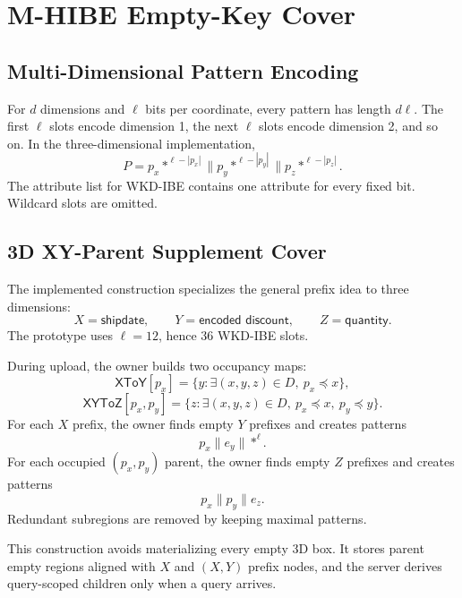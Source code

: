 \documentclass[11pt]{article}
\begin{document}
\section{M-HIBE Empty-Key Cover}

\subsection{Multi-Dimensional Pattern Encoding}

For $d$ dimensions and $\ell$ bits per coordinate, every pattern has length $d\ell$. The first $\ell$ slots encode dimension 1, the next $\ell$ slots encode dimension 2, and so on. In the three-dimensional implementation,
\[
  P = p_x *^{\ell-|p_x|}
  \parallel
  p_y *^{\ell-|p_y|}
  \parallel
  p_z *^{\ell-|p_z|}.
\]
The attribute list for WKD-IBE contains one attribute for every fixed bit. Wildcard slots are omitted.

\subsection{3D XY-Parent Supplement Cover}

The implemented construction specializes the general prefix idea to three dimensions:
\[
  X=\textsf{shipdate},\qquad
  Y=\textsf{encoded discount},\qquad
  Z=\textsf{quantity}.
\]
The prototype uses $\ell=12$, hence 36 WKD-IBE slots.

During upload, the owner builds two occupancy maps:
\[
  \mathsf{XToY}[p_x]
  =
  \{y : \exists (x,y,z)\in D,\ p_x\preceq x\},
\]
\[
  \mathsf{XYToZ}[p_x,p_y]
  =
  \{z : \exists (x,y,z)\in D,\ p_x\preceq x,\ p_y\preceq y\}.
\]
For each $X$ prefix, the owner finds empty $Y$ prefixes and creates patterns
\[
  p_x \parallel e_y \parallel *^\ell.
\]
For each occupied $(p_x,p_y)$ parent, the owner finds empty $Z$ prefixes and creates patterns
\[
  p_x \parallel p_y \parallel e_z.
\]
Redundant subregions are removed by keeping maximal patterns.

This construction avoids materializing every empty 3D box. It stores parent empty regions aligned with $X$ and $(X,Y)$ prefix nodes, and the server derives query-scoped children only when a query arrives.
\end{document}
